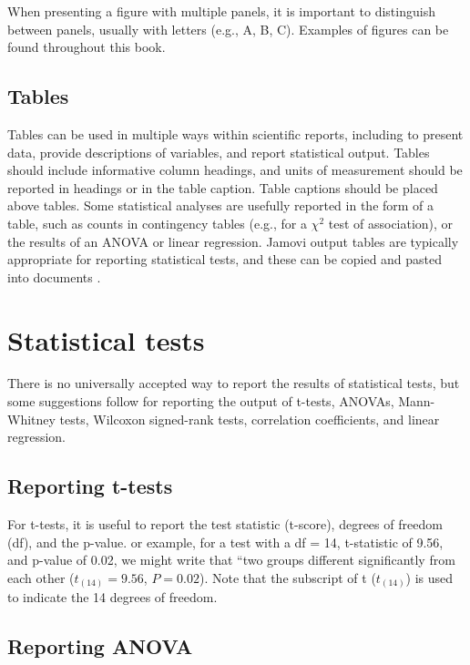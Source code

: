 \documentclass[
]{scrbook}
\begin{document}
When presenting a figure with multiple panels, it is important to distinguish between panels, usually with letters (e.g., A, B, C).
Examples of figures can be found throughout this book.

\hypertarget{tables}{%
\subsection{Tables}\label{tables}}

Tables can be used in multiple ways within scientific reports, including to present data, provide descriptions of variables, and report statistical output.
Tables should include informative column headings, and units of measurement should be reported in headings or in the table caption.
Table captions should be placed above tables.
Some statistical analyses are usefully reported in the form of a table, such as counts in contingency tables (e.g., for a \(\chi^{2}\) test of association), or the results of an ANOVA or linear regression.
Jamovi output tables are typically appropriate for reporting statistical tests, and these can be copied and pasted into documents \citep{Jamovi2022}.

\hypertarget{statistical-tests}{%
\section{Statistical tests}\label{statistical-tests}}

There is no universally accepted way to report the results of statistical tests, but some suggestions follow for reporting the output of t-tests, ANOVAs, Mann-Whitney tests, Wilcoxon signed-rank tests, correlation coefficients, and linear regression.

\hypertarget{reporting-t-tests}{%
\subsection{Reporting t-tests}\label{reporting-t-tests}}

For t-tests, it is useful to report the test statistic (t-score), degrees of freedom (df), and the p-value.
or example, for a test with a df = 14, t-statistic of 9.56, and p-value of 0.02, we might write that ``two groups different significantly from each other (\(t_{(14)} = 9.56\), \(P = 0.02\)).
Note that the subscript of t (\(t_{(14)}\)) is used to indicate the 14 degrees of freedom.

\hypertarget{reporting-anova}{%
\subsection{Reporting ANOVA}\label{reporting-anova}}
\end{document}
